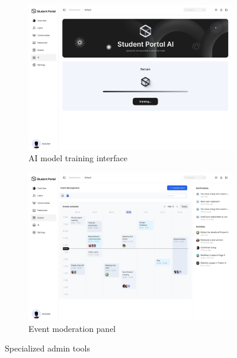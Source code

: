 \begin{figure}[H]
    \centering
    \begin{subfigure}{0.45\textwidth}
        \includegraphics[width=\textwidth]{images/web_interface/AI-training.jpg}
        \caption{AI model training interface}
        \label{fig:ai_training}
    \end{subfigure}
    \begin{subfigure}{0.45\textwidth}
        \includegraphics[width=\textwidth]{images/web_interface/Event-Management-cal.jpg}
        \caption{Event moderation panel}
        \label{fig:event_mgmt}
    \end{subfigure}
    \caption{Specialized admin tools}
    \label{fig:admin_tools}
\end{figure}
